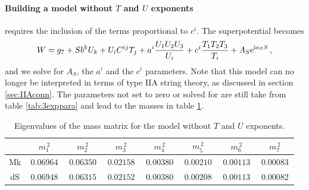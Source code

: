 \documentclass[12pt]{report}
\newcommand{\be}{\begin{equation}}
\newcommand{\ee}{\end{equation}}
\def\rmi{{\rm i}}
\def\rme{{\rm e}}
\begin{document}
\paragraph{Building a model without $T$ and $U$ exponents} requires the inclusion of the terms proportional  to $c^i$. The superpotential becomes
\be
W = g_7 + S b^k U_k + U_i C^{ij} T_j + a^i \frac{U_1 U_2 U_3}{U_i} + c^i \frac{T_1 T_2 T_3}{T_i} + A_S \rme^{\rmi a_S S}\,,
\ee
and we solve for $A_S$, the $a^i$ and the $c^i$ parameters. Note that this model can no longer be interpreted in terms of type IIA string theory, as discussed in section \ref{sec:IIAconn}. The parameters not set to zero or solved for are still take from table \ref{tab:3exppara} and lead to the masses in table \ref{tab:noTUmass}.
\begin{table}[htb]
\center
\begin{tabular}{|c|c|c|c|c|c|c|c|}\hline
     &$\,m_1^{\,2}\,$&$\,m_2^{\,2}\,$&$\,m_3^{\,2}\,$&$\,m_4^{\,2}\,$&$\,m_5^{\,2}\,$&$\,m_6^{\,2}\,$&$\,m_7^{\,2}\,$\\\hline
Mk & $\, 0.06964 \,$ & $\, 0.06350 \,$ & $\, 0.02158 \,$ & $\, 0.00380 \,$ & $\, 0.00210 \,$ & $\, 0.00113 \,$ & $\, 0.00083 \,$ \\\hline  
dS & $\, 0.06948 \,$ & $\, 0.06315 \,$ & $\, 0.02152 \,$ & $\, 0.00380 \,$ & $\, 0.00208 \,$ & $\, 0.00113 \,$ & $\, 0.00082 \,$  \\\hline  
\end{tabular}
\caption{Eigenvalues of the mass matrix for the model without $T$ and $U$ exponents.}
\label{tab:noTUmass}
\end{table}

\FloatBarrier
\end{document}

